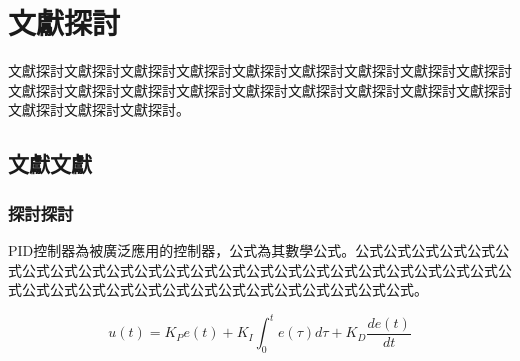 \chapter{文獻探討}
文獻探討文獻探討文獻探討文獻探討文獻探討文獻探討文獻探討文獻探討文獻探討文獻探討文獻探討文獻探討文獻探討文獻探討文獻探討文獻探討文獻探討文獻探討文獻探討文獻探討文獻探討。

\section{文獻文獻}

\subsection{探討探討}

PID控制器為被廣泛應用的控制器，公式\label{f:pid}為其數學公式。公式公式公式公式公式公式公式公式公式公式公式公式公式公式公式公式公式公式公式公式公式公式公式公式公式公式公式公式公式公式公式公式公式公式公式公式公式公式。

\begin{equation}
u(t) = K_P e(t) + K_I\int_{0}^{t} e(\tau) d\tau + K_D\frac{de(t)}{dt} \label{f:pid}
\end{equation}













































